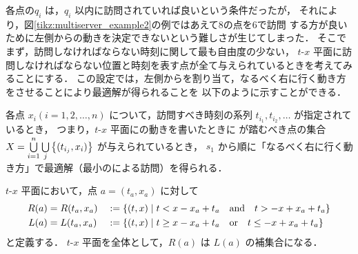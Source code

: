 各点の\shuki $q_i$ は，$q_i$ 以内に訪問されていれば良いという条件だったが，
それにより，図\ref{tikz:multiserver_example2}の例ではあえて\shuki 8の点を\shuki 6で訪問
する方が良いために左側から\server の動きを決定できないという難しさが生じてしまった．
そこでまず，訪問しなければならない時刻に関して最も自由度の少ない，
$t$-$x$ 平面に訪問しなければならない位置と時刻を表す点が全て与えられているときを考えてみることにする．
この設定では，左側から\server を割り当て，なるべく右に行く動き方をさせることにより最適解が得られることを
以下のように示すことができる．


\begin{theo}
	\label{theo:xt_decided_1}
	各点 $x_i ( i = 1,2,\ldots,n)$ について，訪問すべき時刻の系列
	$t_{i_1},t_{i_2}, \ldots$ が指定されているとき，
	つまり，$t$-$x$ 平面に\server の動きを書いたときに
	\server が踏むべき点の集合
	$X = \bigcup\limits_{i = 1}^n \bigcup\limits_j \left\{{(t_{i_j}, x_i)}\right\}$
	が与えられているとき，
	$s_1$ から順に「なるべく右に行く動き方」で最適解（最小の\server による訪問）を得られる．
\end{theo}



\begin{defi}
	$t$-$x$ 平面において，点 $a = (t_a,x_a)$ に対して
	\begin{alignat*}{3}
	R(a)
	&= R(t_a,x_a)
	&&:= \left\{{(t,x)}\;\middle|\;{ t < x - x_a + t_a \quad\text{and}\quad t > -x + x_a + t_a }\right\} \\
	L(a)
	&= L(t_a,x_a)
	&&:= \left\{{(t,x)}\;\middle|\;{ t \geq x - x_a + t_a \quad\text{or}\quad t \leq -x + x_a + t_a }\right\}
	\end{alignat*}
	と定義する．
	$t$-$x$ 平面を全体として，$R(a)$ は $L(a)$ の補集合になる．


\begin{figure}[H]
	\centering
\end{figure}

\end{defi}



